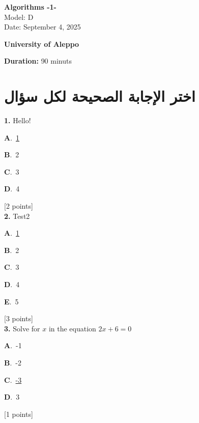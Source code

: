 \documentclass[12pt]{article}
\newcommand{\choice}[3]{%
  \noindent\textbf{#1}.~#2\hfill#3\par\vspace{0.25em}
}
\begin{document}
\begin{flushright}
{\Large \textbf{{\textenglish{Algorithms -1-}}}}\\[0.25em]
{\normalsize \textenglish{Model: }{\textenglish{D}}}\\[0.1em]
{\normalsize \textenglish{Date: }{\textenglish{September 4, 2025}}}
\end{flushright}

\vspace{0.6cm}

\noindent
\begin{minipage}[t]{0.65\textwidth}
  \raggedright
  \textbf{{\textenglish{University of Aleppo}}}\\[0.3em]
\end{minipage}\hfill
\begin{minipage}[t]{0.3\textwidth}
  \raggedleft
  \textenglish{\textbf{Duration: }}{\textenglish{90 minuts}}
\end{minipage}

\vspace{0.9cm}

\section*{اختر الإجابة الصحيحة لكل سؤال}

\noindent \textbf{\textenglish{1.}} {\textenglish{Hello!}}

\noindent\choice{A}{\underline{{\textenglish{1}}}}{}
\noindent\choice{B}{{\textenglish{2}}}{}
\noindent\choice{C}{{\textenglish{3}}}{}
\noindent\choice{D}{{\textenglish{4}}}{}
\hfill {\textenglish{[2 points]}}\\[0.5em]

\noindent \textbf{\textenglish{2.}} {\textenglish{Test2}}

\noindent\choice{A}{\underline{{\textenglish{1}}}}{}
\noindent\choice{B}{{\textenglish{2}}}{}
\noindent\choice{C}{{\textenglish{3}}}{}
\noindent\choice{D}{{\textenglish{4}}}{}
\noindent\choice{E}{{\textenglish{5}}}{}
\hfill {\textenglish{[3 points]}}\\[0.5em]

\noindent \textbf{\textenglish{3.}} {\textenglish{Solve for }}\(x \){\textenglish{ in the equation }}\(2x+6 = 0 \)

\noindent\choice{A}{{\textenglish{-1}}}{}
\noindent\choice{B}{{\textenglish{-2}}}{}
\noindent\choice{C}{\underline{{\textenglish{-3}}}}{}
\noindent\choice{D}{{\textenglish{3}}}{}
\hfill {\textenglish{[1 points]}}\\[0.5em]
\end{document}
